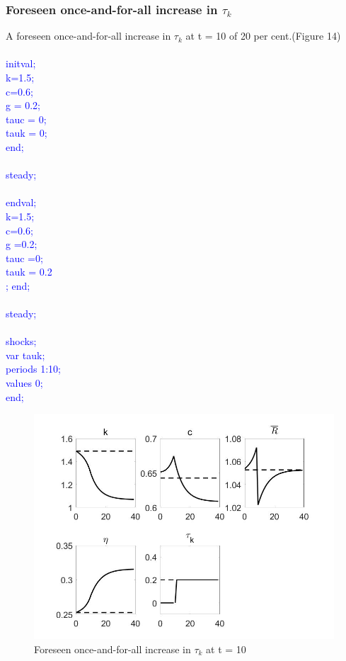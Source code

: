 \documentclass[a4paper,12pt]{scrartcl} %
\begin{document}
\vspace{4cm}

\subsubsection{Foreseen once-and-for-all increase in $\tau_k$}

A foreseen once-and-for-all increase in $\tau_k$ at t = 10 of 20 per cent.(Figure 14)\\
\\
\textcolor{blue}{
initval;\\
k=1.5;\\
c=0.6;\\
g = 0.2;\\
tauc = 0;\\
tauk = 0;\\
end;\\
\\
steady;\\
\\
endval;\\
k=1.5;\\
c=0.6;\\
g =0.2;\\
tauc =0;\\
tauk = 0.2\\;
end;\\
\\
steady;\\
\\
shocks;\\
var tauk;\\
periods 1:10;\\
values 0;\\
end;}\\

\begin{figure}[htbp!]
		\centering
			\includegraphics[width=0.8\linewidth]{fig14.jpg}
            \caption{Foreseen once-and-for-all increase in $\tau_k$ at t = 10}\label{14}
\end{figure}
\end{document}
